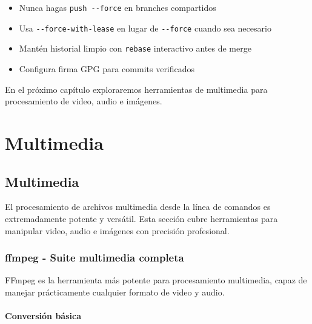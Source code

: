 \documentclass[
  11pt,
  letterpaper,
  oneside,
  openany]{scrbook}
\providecommand{\tightlist}{%
  \setlength{\itemsep}{0pt}\setlength{\parskip}{0pt}}
\begin{document}
\begin{tcolorbox}[enhanced jigsaw, toprule=.15mm, bottomrule=.15mm, opacityback=0, coltitle=black, rightrule=.15mm, colframe=quarto-callout-important-color-frame, titlerule=0mm, opacitybacktitle=0.6, left=2mm, colback=white, bottomtitle=1mm, arc=.35mm, leftrule=.75mm, title=\textcolor{quarto-callout-important-color}{\faExclamation}\hspace{0.5em}{Mejores prácticas}, colbacktitle=quarto-callout-important-color!10!white, breakable, toptitle=1mm]

\begin{itemize}
\tightlist
\item
  Nunca hagas \texttt{push\ -\/-force} en branches compartidos
\item
  Usa \texttt{-\/-force-with-lease} en lugar de \texttt{-\/-force}
  cuando sea necesario
\item
  Mantén historial limpio con \texttt{rebase} interactivo antes de merge
\item
  Configura firma GPG para commits verificados
\end{itemize}

\end{tcolorbox}

En el próximo capítulo exploraremos herramientas de multimedia para
procesamiento de video, audio e imágenes.

\part{Multimedia}

\chapter{Multimedia}\label{multimedia-2}

El procesamiento de archivos multimedia desde la línea de comandos es
extremadamente potente y versátil. Esta sección cubre herramientas para
manipular video, audio e imágenes con precisión profesional.

\section{ffmpeg - Suite multimedia completa}\label{sec-ffmpeg}

FFmpeg es la herramienta más potente para procesamiento multimedia,
capaz de manejar prácticamente cualquier formato de video y audio.

\subsection{Conversión básica}\label{conversiuxf3n-buxe1sica}
\end{document}
